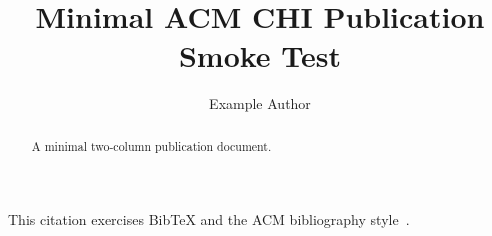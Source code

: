 \documentclass[sigconf]{acmart}
\title{Minimal ACM CHI Publication Smoke Test}
\author{Example Author}
\affiliation{%
  \institution{Example University}
  \country{Vietnam}
}
\begin{document}
\begin{abstract}
  A minimal two-column publication document.
\end{abstract}

\maketitle

\makeatletter
\if@twocolumn\else
\PackageError{acm-smoke}{SIGCONF layout must be two columns}{}%
\fi
\makeatother

This citation exercises BibTeX and the ACM bibliography style~\cite{chi}.



\end{document}
